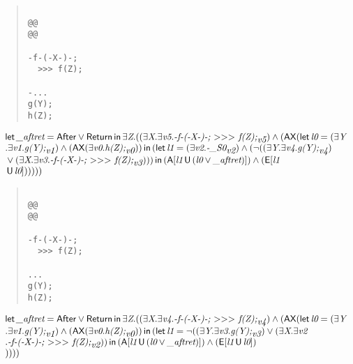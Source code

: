 \documentclass{article}
\newcommand{\U}{\,\mbox{\sf{U}}\,}
\newcommand{\A}{\mbox{\sf{A}}}
\newcommand{\E}{\mbox{\sf{E}}}
\newcommand{\AX}{\mbox{\sf{AX}}}
\newcommand{\mita}[1]{\mbox{\it{{#1}}}}
\newcommand{\msf}[1]{\mbox{\sf{{#1}}}}
\newcommand{\mth}[1]{\({#1}\)}
\begin{document}
\begin{quote}\begin{verbatim}

@@
@@

-f-(-X-)-;
  >>> f(Z);

-...
g(Y);
h(Z);
\end{verbatim}\end{quote}

\[\begin{array}{l}
\mita{\sf{let}} \, \mita{\_aftret} = \msf{After} \vee \msf{Return} \, \mita{\sf{in}} \, \exists \mita{Z} . ((\exists \mita{X} . \exists \mita{v5} . \mita{-f-(-X-)-;
  \mth{>}\mth{>}\mth{>} f(Z);}_{\mita{v5}}) \wedge (\AX(\mita{\sf{let}} \, \mita{l0} = (\exists \mita{Y}\\\mbox{} . \exists \mita{v1} . \mita{g(Y);}_{\mita{v1}}) \wedge (\AX(\exists \mita{v0} . \mita{h(Z);}_{\mita{v0}})) \, \mita{\sf{in}} \, (\mita{\sf{let}} \, \mita{l1} = (\exists \mita{v2} . \mita{-\_S0}_{\mita{v2}}) \wedge (\neg ((\exists \mita{Y} . \exists \mita{v4} . \mita{g(Y);}_{\mita{v4}})\\\mbox{} \vee (\exists \mita{X} . \exists \mita{v3} . \mita{-f-(-X-)-;
  \mth{>}\mth{>}\mth{>} f(Z);}_{\mita{v3}}))) \, \mita{\sf{in}} \, (\A[\mita{l1} \U (\mita{l0} \vee \mita{\_aftret})]
) \wedge (\E[\mita{l1}\\\mbox{} \U \mita{l0}]
)
)
)))

\end{array}\]

\begin{quote}\begin{verbatim}

@@
@@

-f-(-X-)-;
  >>> f(Z);

...
g(Y);
h(Z);
\end{verbatim}\end{quote}

\[\begin{array}{l}
\mita{\sf{let}} \, \mita{\_aftret} = \msf{After} \vee \msf{Return} \, \mita{\sf{in}} \, \exists \mita{Z} . ((\exists \mita{X} . \exists \mita{v4} . \mita{-f-(-X-)-;
  \mth{>}\mth{>}\mth{>} f(Z);}_{\mita{v4}}) \wedge (\AX(\mita{\sf{let}} \, \mita{l0} = (\exists \mita{Y}\\\mbox{} . \exists \mita{v1} . \mita{g(Y);}_{\mita{v1}}) \wedge (\AX(\exists \mita{v0} . \mita{h(Z);}_{\mita{v0}})) \, \mita{\sf{in}} \, (\mita{\sf{let}} \, \mita{l1} = \neg ((\exists \mita{Y} . \exists \mita{v3} . \mita{g(Y);}_{\mita{v3}}) \vee (\exists \mita{X} . \exists \mita{v2}\\\mbox{} . \mita{-f-(-X-)-;
  \mth{>}\mth{>}\mth{>} f(Z);}_{\mita{v2}})) \, \mita{\sf{in}} \, (\A[\mita{l1} \U (\mita{l0} \vee \mita{\_aftret})]
) \wedge (\E[\mita{l1} \U \mita{l0}]
)\\\mbox{}
)
)))

\end{array}\]
\end{document}
